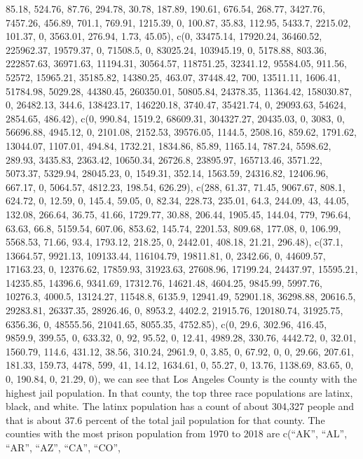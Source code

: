 \documentclass[
]{article}
\begin{document}
85.18, 524.76, 87.76, 294.78, 30.78, 187.89, 190.61, 676.54, 268.77,
3427.76, 7457.26, 456.89, 701.1, 769.91, 1215.39, 0, 100.87, 35.83,
112.95, 5433.7, 2215.02, 101.37, 0, 3563.01, 276.94, 1.73, 45.05), c(0,
33475.14, 17920.24, 36460.52, 225962.37, 19579.37, 0, 71508.5, 0,
83025.24, 103945.19, 0, 5178.88, 803.36, 222857.63, 36971.63, 11194.31,
30564.57, 118751.25, 32341.12, 95584.05, 911.56, 52572, 15965.21,
35185.82, 14380.25, 463.07, 37448.42, 700, 13511.11, 1606.41, 51784.98,
5029.28, 44380.45, 260350.01, 50805.84, 24378.35, 11364.42, 158030.87,
0, 26482.13, 344.6, 138423.17, 146220.18, 3740.47, 35421.74, 0,
29093.63, 54624, 2854.65, 486.42), c(0, 990.84, 1519.2, 68609.31,
304327.27, 20435.03, 0, 3083, 0, 56696.88, 4945.12, 0, 2101.08, 2152.53,
39576.05, 1144.5, 2508.16, 859.62, 1791.62, 13044.07, 1107.01, 494.84,
1732.21, 1834.86, 85.89, 1165.14, 787.24, 5598.62, 289.93, 3435.83,
2363.42, 10650.34, 26726.8, 23895.97, 165713.46, 3571.22, 5073.37,
5329.94, 28045.23, 0, 1549.31, 352.14, 1563.59, 24316.82, 12406.96,
667.17, 0, 5064.57, 4812.23, 198.54, 626.29), c(288, 61.37, 71.45,
9067.67, 808.1, 624.72, 0, 12.59, 0, 145.4, 59.05, 0, 82.34, 228.73,
235.01, 64.3, 244.09, 43, 44.05, 132.08, 266.64, 36.75, 41.66, 1729.77,
30.88, 206.44, 1905.45, 144.04, 779, 796.64, 63.63, 66.8, 5159.54,
607.06, 853.62, 145.74, 2201.53, 809.68, 177.08, 0, 106.99, 5568.53,
71.66, 93.4, 1793.12, 218.25, 0, 2442.01, 408.18, 21.21, 296.48),
c(37.1, 13664.57, 9921.13, 109133.44, 116104.79, 19811.81, 0, 2342.66,
0, 44609.57, 17163.23, 0, 12376.62, 17859.93, 31923.63, 27608.96,
17199.24, 24437.97, 15595.21, 14235.85, 14396.6, 9341.69, 17312.76,
14621.48, 4604.25, 9845.99, 5997.76, 10276.3, 4000.5, 13124.27, 11548.8,
6135.9, 12941.49, 52901.18, 36298.88, 20616.5, 29283.81, 26337.35,
28926.46, 0, 8953.2, 4402.2, 21915.76, 120180.74, 31925.75, 6356.36, 0,
48555.56, 21041.65, 8055.35, 4752.85), c(0, 29.6, 302.96, 416.45,
9859.9, 399.55, 0, 633.32, 0, 92, 95.52, 0, 12.41, 4989.28, 330.76,
4442.72, 0, 32.01, 1560.79, 114.6, 431.12, 38.56, 310.24, 2961.9, 0,
3.85, 0, 67.92, 0, 0, 29.66, 207.61, 181.33, 159.73, 4478, 599, 41,
14.12, 1634.61, 0, 55.27, 0, 13.76, 1138.69, 83.65, 0, 0, 190.84, 0,
21.29, 0), we can see that Los Angeles County is the county with the
highest jail population. In that county, the top three race populations
are latinx, black, and white. The latinx population has a count of about
304,327 people and that is about 37.6 percent of the total jail
population for that county. The counties with the most prison population
from 1970 to 2018 are c(``AK'', ``AL'', ``AR'', ``AZ'', ``CA'', ``CO'',
\end{document}
